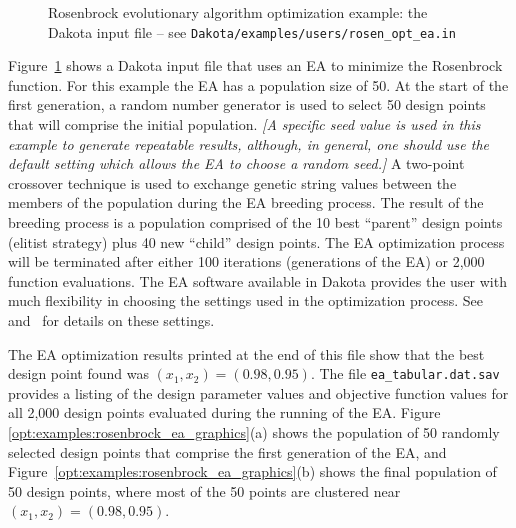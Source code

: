 \begin{figure}[ht!]
  \centering
  \begin{bigbox}
    \begin{small}
    \end{small}
  \end{bigbox}
  \caption{Rosenbrock evolutionary algorithm optimization example: the
  Dakota input file --
see \texttt{Dakota/examples/users/rosen\_opt\_ea.in} }
  \label{opt:examples:rosenbrock_ea}
\end{figure}

Figure~\ref{opt:examples:rosenbrock_ea} shows a Dakota input file that
uses an EA to minimize the Rosenbrock function. For this
example the EA has a population size of 50. At the start of the first
generation, a random number generator is used to select 50 design
points that will comprise the initial population. \emph{[A specific
  seed value is used in this example to generate repeatable results,
  although, in general, one should use the default setting which
  allows the EA to choose a random seed.]} A two-point crossover
technique is used to exchange genetic string values between the
members of the population during the EA breeding process. The result
of the breeding process is a population comprised of the 10 best
``parent'' design points (elitist strategy) plus 40 new ``child''
design points. The EA optimization process will be terminated after
either 100 iterations (generations of the EA) or 2,000 function
evaluations. The EA software available in Dakota provides the user
with much flexibility in choosing the settings used in the
optimization process. See~\cite{RefMan} and~\cite{Har06} for details on these
settings.

The EA optimization results
printed at the end of this file show that the best design point found
was $(x_1,x_2) = (0.98,0.95)$. The file
\texttt{ea\_tabular.dat.sav} provides a listing of the design
parameter values and objective function values for all 2,000 design
points evaluated during the running of the EA. Figure~
\ref{opt:examples:rosenbrock_ea_graphics}(a) shows the population of
50 randomly selected design points that comprise the first generation
of the EA, and Figure~\ref{opt:examples:rosenbrock_ea_graphics}(b)
shows the final population of 50 design points, where most of the 50
points are clustered near $(x_1,x_2) = (0.98,0.95)$.

